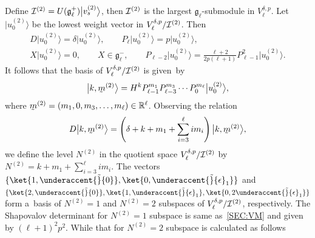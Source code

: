 \documentclass[pdftex]{sigma}
\numberwithin{equation}{section}
\begin{document}
Def\/ine $ {\cal I}^{(2)} = U({\mathfrak g}_{\ell}^{+}) \big|v_s^{(2)}\big\rangle $, then $ {\cal I}^{(2)} $ is the largest $
{\mathfrak g}_{\ell}$-submodule in $ V^{\delta,p}_{\ell}$.
Let $ \big|u_0^{(2)}\big\rangle  $ be the lowest weight vector in $ V^{\delta,p}_{\ell}/{\cal I}^{(2)}$.
Then
\begin{gather*}
    D \big|u_0^{(2)}\big\rangle  = \delta \big|u_0^{(2)}\big\rangle ,
\qquad
P_{\ell} \big|u_0^{(2)}\big\rangle  = p \big|u_0^{(2)}\big\rangle ,
\nonumber
\\
    X \big|u_0^{(2)}\big\rangle  = 0, \qquad X \in {\mathfrak g}_{\ell}^-,
\qquad
P_{\ell-2} \big|u_0^{(2)}\big\rangle  = \frac{\ell+2}{2p (\ell+1)} P_{\ell-1}^2 \big|u_0^{(2)}\big\rangle .
\end{gather*}
It follows that the basis of $ V^{\delta,p}_{\ell}/{\cal I}^{(2)} $ is given~by
\begin{gather*}
\big|k,\underaccent{\tilde}{m}^{(2)}\big\rangle  = H^k   P_{\ell-1}^{m_1}  P_{\ell-3}^{m_3} \cdots P_{0}^{m_{\ell}}
\big|u_0^{(2)}\big\rangle ,
\end{gather*}
where $ \underaccent{\tilde}{m}^{(2)} = (m_1, 0, m_3, \dots,m_{\ell}) \in {\mathbb R}^{\ell}$.
Observing the relation
\begin{gather*}
D \big|k,\underaccent{\tilde}{m}^{(2)}\big\rangle  = \left(\delta+k +m_1 + \sum\limits_{i=3}^{\ell}i m_i\right)
\big|k,\underaccent{\tilde}{m}^{(2)}\big\rangle ,
\end{gather*}
we def\/ine the level $ N^{(2)} $ in the quotient space $ V^{\delta,p}_{\ell}/{\cal I}^{(2)} $ by $  N^{(2)}
= k + m_1 + \sum\limits_{i=3}^{\ell} i m_{i}$.
The vectors $ \{
\ket{1,\underaccent{\tilde}{0}},
\ket{0,\underaccent{\tilde}{\epsilon}_1}
\} $ and $ \{
\ket{2,\underaccent{\tilde}{0}},
\ket{1,\underaccent{\tilde}{\epsilon}_1},
\ket{0,2\underaccent{\tilde}{\epsilon}_1}
\}$ form a~basis of $ N^{(2)} = 1 $ and $ N^{(2)} = 2 $ subspaces of $ V^{\delta,p}_{\ell}/{\cal I}^{(2)}$,
respectively.
The Shapovalov determinant for $ N^{(2)} = 1 $ subspace is same as~\eqref{SEC:VM} and given by $ (\ell+1)^2 p^2$.
While that for $ N^{(2)} = 2 $ subspace is calculated as follows
\end{document}
